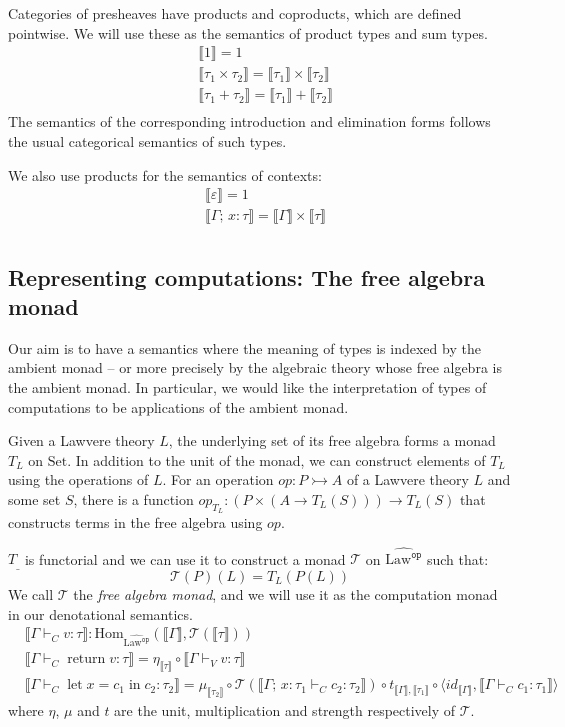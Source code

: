 \documentclass[acmsmall, screen, nonacm]{acmart}
\theoremstyle{definition}
\newcommand{\setc}{\mathrm{Set}}
\newcommand{\lawc}{\mathrm{Law}}
\newcommand{\lawcop}{\lawc^{\mathtt{op}}}
\newcommand{\pshlawcop}{\widehat{\lawcop}}
\newcommand{\homset}[3]{\mathrm{Hom}_{#1}(#2, #3)}
\newcommand{\sem}[1]{\llbracket #1 \rrbracket}
\newcommand{\mon}{\mathcal{T}}
\newcommand{\types}{\mathrel{:}}
\newcommand{\cempty}{\varepsilon}
\newcommand{\ccons}[2]{#1;\,#2}
\newcommand{\lbind}[3]{\ccons{#1}{#2\types#3}}
\newcommand{\return}[1]{\mathop{\mathrm{return}} #1}
\newcommand{\letv}[3]{\mathop{\mathrm{let}} #1 = #2 \mathop{\mathrm{in}} #3}
\newcommand{\turnv}{\mathrel{\vdash_V}}
\newcommand{\turnc}{\mathrel{\vdash_C}}
\begin{document}
Categories of presheaves have products and coproducts, which are defined
pointwise. We will use these as the semantics of product types and sum
types.
\begin{align*}
&\sem{1} = 1 \\
&\sem{\tau_1 \times \tau_2} = \sem{\tau_1} \times \sem{\tau_2} \\
&\sem{\tau_1 + \tau_2} = \sem{\tau_1} + \sem{\tau_2} \\
\end{align*}
The semantics of the corresponding introduction and elimination forms
follows the usual categorical semantics of such types.

We also use products for the semantics of contexts:
\begin{align*}
&\sem{\cempty} = 1 \\
&\sem{\lbind{\Gamma}{x}{\tau}} = \sem{\Gamma} \times \sem{\tau} \\
\end{align*}

\subsection{Representing computations: The free algebra monad}

Our aim is to have a semantics where the meaning of types is indexed by
the ambient monad -- or more precisely by the algebraic theory whose
free algebra is the ambient monad. In particular, we would like the
interpretation of types of computations to be applications of the
ambient monad.

Given a Lawvere theory $L$, the underlying set of its free algebra forms
a monad $T_L$ on $\setc$. In addition to the unit of the monad, we can
construct elements of $T_L$ using the operations of $L$. For an
operation $op \types P \rightarrowtail A$ of a Lawvere theory $L$ and
some set $S$, there is a function
$op_{T_L} \types (P \times (A \rightarrow T_L(S))) \rightarrow T_L(S)$
that constructs terms in the free algebra using $op$.

$T_{\_}$ is functorial and we can use it to construct a monad $\mon$ on
$\pshlawcop$ such that:
\begin{equation*}
\mon(P)(L) = T_L(P(L))
\end{equation*}
We call $\mon$ the \emph{free algebra monad}, and we will use it as the
computation monad in our denotational semantics.
\begin{align*}
  &\sem{\Gamma \turnc v \types \tau} \mathrel{:}
    \homset{\pshlawcop}{\sem{\Gamma}}{\mon(\sem{\tau})} \\
  &\sem{\Gamma \turnc \return{v} \types \tau} =
    \eta_{\sem{\tau}} \circ \sem{\Gamma \turnv v \types \tau} \\
  &\sem{\Gamma \turnc \letv{x}{c_1}{c_2} \types \tau_2} =
    \mu_{\sem{\tau_2}}
    \circ \mon(\sem{\lbind{\Gamma}{x}{\tau_1} \turnc c_2 \types \tau_2})
    \circ t_{\sem{\Gamma}, \sem{\tau_1}}
    \circ \langle id_{\sem{\Gamma}}, \sem{\Gamma \turnc c_1 \types \tau_1} \rangle
\end{align*}
where $\eta$, $\mu$ and $t$ are the unit, multiplication and strength
respectively of $\mon$.
\end{document}
